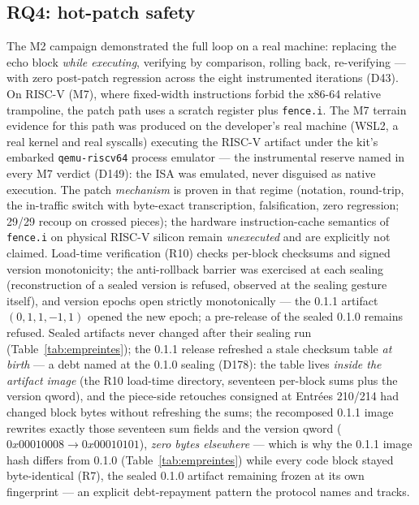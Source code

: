 \documentclass[11pt,a4paper]{article}
\newcommand{\code}[1]{\texttt{\small #1}}
\begin{document}
\subsection{RQ4: hot-patch safety}\label{sec:rq4}

The M2 campaign demonstrated the full loop on a real machine: replacing
the echo block \emph{while executing}, verifying by comparison,
rolling back, re-verifying --- with zero post-patch regression across the
eight instrumented iterations (D43). On RISC-V (M7), where fixed-width
instructions forbid the x86-64 relative trampoline, the patch path uses
a scratch register plus \code{fence.i}. The M7 terrain evidence for this
path was produced on the developer's real machine (WSL2, a real kernel
and real syscalls) executing the RISC-V artifact under the kit's
embarked \code{qemu-riscv64} process emulator --- the instrumental
reserve named in every M7 verdict (D149): the ISA was emulated, never
disguised as native execution. The patch \emph{mechanism} is proven in
that regime (notation, round-trip, the in-traffic switch with byte-exact
transcription, falsification, zero regression; 29/29 recoup on crossed
pieces); the hardware instruction-cache semantics of \code{fence.i} on
physical RISC-V silicon remain \emph{unexecuted} and are explicitly not
claimed. Load-time verification (R10)
checks per-block checksums and signed version monotonicity; the
anti-rollback barrier was exercised at each sealing (reconstruction of a
sealed version is refused, observed at the sealing gesture itself), and
version epochs open strictly monotonically --- the 0.1.1 artifact
$(0,1,1,-1,1)$ opened the new epoch; a pre-release of the sealed 0.1.0
remains refused. Sealed artifacts never changed after their sealing run
(Table~\ref{tab:empreintes}); the 0.1.1 release refreshed a stale
checksum table \emph{at birth} --- a debt named at the 0.1.0 sealing
(D178): the table lives \emph{inside the artifact image} (the R10
load-time directory, seventeen per-block sums plus the version qword),
and the piece-side retouches consigned at Entr\'ees 210/214 had changed
block bytes without refreshing the sums; the recomposed 0.1.1 image
rewrites exactly those seventeen sum fields and the version qword
($0x00010008 \to 0x00010101$), \emph{zero bytes elsewhere} --- which
is why the 0.1.1 image hash differs from 0.1.0
(Table~\ref{tab:empreintes}) while every code block stayed byte-identical
(R7), the sealed 0.1.0 artifact remaining frozen at its own fingerprint
--- an explicit debt-repayment pattern the protocol names and tracks.
\end{document}

